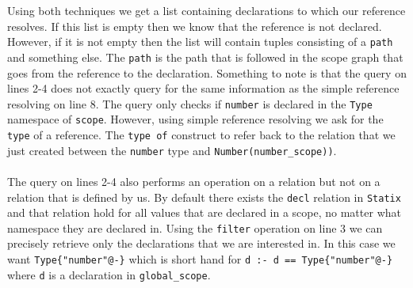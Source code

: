 \documentclass{article}
\newcommand{\ttt}[1]{\texttt{#1}}
\begin{document}
Using both techniques we get a list containing declarations to which our reference resolves.
If this list is empty then we know that the reference is not declared.
However, if it is not empty then the list will contain tuples consisting of a \ttt{path} and something else.
The \ttt{path} is the path that is followed in the scope graph that goes from the reference to the declaration.
Something to note is that the query on lines 2-4 does not exactly query for the same information as the simple reference resolving on line 8.
The query only checks if \ttt{number} is declared in the \ttt{Type} namespace of \ttt{scope}.
However, using simple reference resolving we ask for the \ttt{type} of a reference.
The \ttt{type of} construct to refer back to the relation that we just created between the \ttt{number} type and \ttt{Number(number\_scope))}. 
\\\\
The query on lines 2-4 also performs an operation on a relation but not on a relation that is defined by us.
By default there exists the \ttt{decl} relation in \ttt{Statix} and that relation hold for all values that are declared in a scope, no matter what namespace they are declared in.
Using the \ttt{filter} operation on line 3 we can precisely retrieve only the declarations that we are interested in.
In this case we want \ttt{Type\{"number"@-\}} which is short hand for \ttt{d :- d == Type\{"number"@-\}} where \ttt{d} is a declaration in \ttt{global\_scope}.
\end{document}
